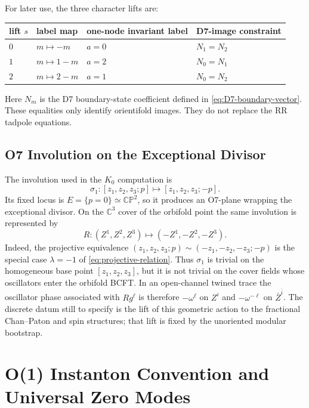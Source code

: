 \documentclass[11pt]{article}
\newcommand{\C}{\mathbb{C}}
\newcommand{\CP}{\mathbb{CP}}
\begin{document}
For later use, the three character lifts are:
\begin{center}
\begin{tabular}{@{}llll@{}}
\toprule
lift $s$ & label map & one-node invariant label & D7-image constraint \\
\midrule
$0$ & $m\mapsto -m$ & $a=0$ & $N_1=N_2$ \\
$1$ & $m\mapsto 1-m$ & $a=2$ & $N_0=N_1$ \\
$2$ & $m\mapsto 2-m$ & $a=1$ & $N_0=N_2$ \\
\bottomrule
\end{tabular}
\end{center}
Here $N_m$ is the D7 boundary-state coefficient defined in
\eqref{eq:D7-boundary-vector}. These equalities only identify orientifold images. They do not
replace the RR tadpole equations.

\subsection{O7 Involution on the Exceptional Divisor}

The involution used in the \(K_0\) computation is
\begin{equation}
  \sigma_1 : [z_1,z_2,z_3;p]\longmapsto [z_1,z_2,z_3;-p].
  \label{eq:sigma1}
\end{equation}
Its fixed locus is $E=\{p=0\}\simeq \CP^2$, so it produces an O7-plane wrapping the
exceptional divisor. On the $\C^3$ cover of the orbifold point the same involution is represented
by
\begin{equation}
  R:(Z^1,Z^2,Z^3)\longmapsto (-Z^1,-Z^2,-Z^3).
  \label{eq:sigma1-cover-lift}
\end{equation}
Indeed, the projective equivalence
\((z_1,z_2,z_3;p)\sim(-z_1,-z_2,-z_3;-p)\) is the special case
\(\lambda=-1\) of \eqref{eq:projective-relation}. Thus \(\sigma_1\) is trivial on the
homogeneous base point \([z_1,z_2,z_3]\), but it is not trivial on the cover fields whose
oscillators enter the orbifold BCFT. In an open-channel twined trace the oscillator phase
associated with \(R g^\ell\) is therefore \(-\omega^\ell\) on \(Z^i\) and
\(-\omega^{-\ell}\) on \(\bar Z^{\bar i}\). The discrete datum still to specify is the lift of this
geometric action to the fractional Chan--Paton and spin structures; that lift is fixed by the
unoriented modular bootstrap.

\section{O(1) Instanton Convention and Universal Zero Modes}
\end{document}
